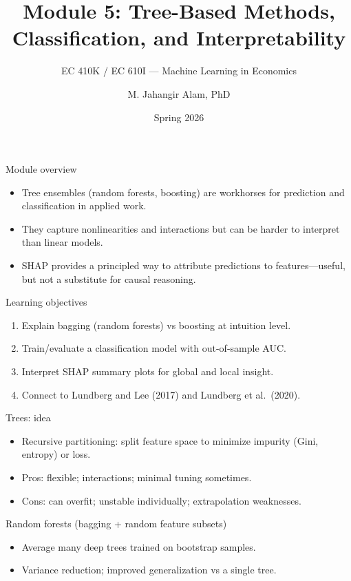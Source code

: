 \documentclass[aspectratio=169,11pt]{beamer}
\title[Trees \& SHAP]{Module 5: Tree-Based Methods, Classification, and Interpretability}
\subtitle{EC 410K / EC 610I --- Machine Learning in Economics}
\author{M. Jahangir Alam, PhD}
\institute{Wilfrid Laurier University}
\date{Spring 2026}
\begin{document}
\begin{frame}[plain]
  \titlepage
\end{frame}

\begin{frame}{Module overview}
  \begin{itemize}
    \item Tree ensembles (random forests, boosting) are workhorses for prediction and classification in applied work.
    \item They capture nonlinearities and interactions but can be harder to interpret than linear models.
    \item SHAP provides a principled way to attribute predictions to features---useful, but not a substitute for causal reasoning.
  \end{itemize}
\end{frame}

\begin{frame}{Learning objectives}
  \begin{enumerate}
    \item Explain bagging (random forests) vs boosting at intuition level.
    \item Train/evaluate a classification model with out-of-sample AUC.
    \item Interpret SHAP summary plots for global and local insight.
    \item Connect to Lundberg and Lee (2017) and Lundberg et al.\ (2020).
  \end{enumerate}
\end{frame}

\begin{frame}{Trees: idea}
  \begin{itemize}
    \item Recursive partitioning: split feature space to minimize impurity (Gini, entropy) or loss.
    \item Pros: flexible; interactions; minimal tuning sometimes.
    \item Cons: can overfit; unstable individually; extrapolation weaknesses.
  \end{itemize}
\end{frame}

\begin{frame}{Random forests (bagging + random feature subsets)}
  \begin{itemize}
    \item Average many deep trees trained on bootstrap samples.
    \item Variance reduction; improved generalization vs a single tree.
  \end{itemize}
\end{frame}
\end{document}
